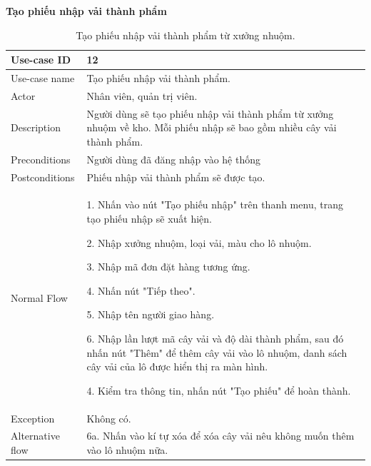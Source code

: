 \newpage
\textbf{Tạo phiếu nhập vải thành phẩm}
\begin{table}[!htp]
    \centering
    \begin{tabular}{|m{3cm}|m{10cm}|}
    \hline 
        Use-case ID & 12\\ \hline
        Use-case name & Tạo phiếu nhập vải thành phẩm.\\ \hline
        Actor & Nhân viên, quản trị viên.\\ \hline
        Description & Người dùng sẽ tạo phiếu nhập vải thành phẩm từ xưởng nhuộm về kho. Mỗi phiếu nhập sẽ bao gồm nhiều cây vải thành phẩm.\\ \hline
        Preconditions & Người dùng đã đăng nhập vào hệ thống \\ \hline
        Postconditions & Phiếu nhập vải thành phẩm sẽ được tạo.\\ \hline
        Normal Flow & 
        1. Nhấn vào nút "Tạo phiếu nhập" trên thanh menu, trang tạo phiếu nhập sẽ xuất hiện.\par
        2. Nhập xưởng nhuộm, loại vải, màu cho lô nhuộm.\par
        3. Nhập mã đơn đặt hàng tương ứng.\par
        4. Nhấn nút "Tiếp theo".\par
        5. Nhập tên người giao hàng.\par
        6.  Nhập lần lượt mã cây vải và độ dài thành phẩm, sau đó nhấn nút "Thêm" để thêm cây vải vào lô nhuộm, danh sách cây vải của lô được hiển thị ra màn hình.\par
        4. Kiểm tra thông tin, nhấn nút "Tạo phiếu" để hoàn thành.
        \\ \hline
        Exception & Không có.
        \\ \hline
        Alternative flow & 
        6a. Nhấn vào kí tự xóa để xóa cây vải nêu không muốn thêm vào lô nhuộm nữa.
        \\ 
    \hline 
    \end{tabular}
    \caption{Tạo phiếu nhập vải thành phẩm từ xưởng nhuộm.}
    \label{bang11}
\end{table}

